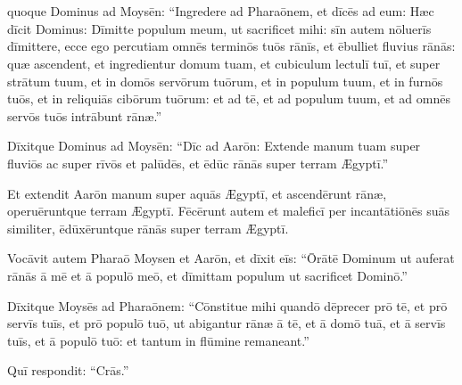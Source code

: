 \chapter{}


\thispagestyle{empty}

 quoque Dominus ad Moysēn: ``Ingredere 
ad Pharaōnem, et dīcēs ad eum: Hæc dīcit
Dominus: Dīmitte populum meum, ut sacrificet mihi: sīn autem nōluerīs
dīmittere, ecce ego percutiam omnēs terminōs tuōs
rānīs,  et ēbulliet fluvius
rānās: quæ ascendent, et ingredientur domum tuam, et cubiculum lectulī tuī, et super strātum
tuum, et in domōs servōrum tuōrum, et in populum tuum, et in
furnōs tuōs, et in reliquiās cibōrum tuōrum:
et ad tē, et ad populum tuum, et ad omnēs servōs tuōs intrābunt
rānæ.''

Dīxitque Dominus ad Moysēn: ``Dīc ad
Aarōn: Extende manum tuam super fluviōs ac super rīvōs et
palūdēs, et ēdūc rānās super terram Ægyptī.''

Et extendit Aarōn manum super aquās Ægyptī, et ascendērunt
rānæ, operuēruntque terram Ægyptī.  Fēcērunt autem et
maleficī per incantātiōnēs suās similiter, ēdūxēruntque rānās super terram Ægyptī.

Vocāvit autem Pharaō Moysen et Aarōn, et
dīxit eīs: ``Ōrātē Dominum ut auferat rānās ā mē et ā populō
meō, et dīmittam populum ut sacrificet Dominō.''

Dīxitque Moysēs
ad Pharaōnem: ``Cōnstitue mihi quandō
dēprecer prō tē, et prō servīs tuīs, et prō populō tuō, ut
abigantur rānæ ā tē, et ā domō tuā, et ā
servīs tuīs, et ā populō tuō: et tantum in flūmine remaneant.''

Quī respondit: ``Crās.''

